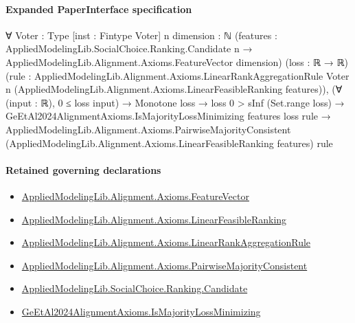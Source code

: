 \documentclass[10pt]{article}
\begin{document}
\paragraph{Expanded PaperInterface specification}
\begin{ReviewVerbatim}
∀ {Voter : Type} [inst : Fintype Voter] {n dimension : ℕ}
  (features :
    AppliedModelingLib.SocialChoice.Ranking.Candidate n → AppliedModelingLib.Alignment.Axioms.FeatureVector dimension)
  (loss : ℝ → ℝ)
  (rule :
    AppliedModelingLib.Alignment.Axioms.LinearRankAggregationRule Voter n
      (AppliedModelingLib.Alignment.Axioms.LinearFeasibleRanking features)),
  (∀ (input : ℝ), 0 ≤ loss input) →
    Monotone loss →
      loss 0 > sInf (Set.range loss) →
        GeEtAl2024AlignmentAxioms.IsMajorityLossMinimizing features loss rule →
          AppliedModelingLib.Alignment.Axioms.PairwiseMajorityConsistent
            (AppliedModelingLib.Alignment.Axioms.LinearFeasibleRanking features) rule
\end{ReviewVerbatim}

\paragraph{Retained governing declarations}
\begin{itemize}\raggedright
\item \hyperlink{library-prerequisite-a0b67c6a143b0b13}{Applied\allowbreak{}Modeling\allowbreak{}Lib.\allowbreak{}Alignment.\allowbreak{}Axioms.\allowbreak{}Feature\allowbreak{}Vector}
\item \hyperlink{library-prerequisite-3c30aae25bef2671}{Applied\allowbreak{}Modeling\allowbreak{}Lib.\allowbreak{}Alignment.\allowbreak{}Axioms.\allowbreak{}Linear\allowbreak{}Feasible\allowbreak{}Ranking}
\item \hyperlink{library-prerequisite-43447e121a1884f9}{Applied\allowbreak{}Modeling\allowbreak{}Lib.\allowbreak{}Alignment.\allowbreak{}Axioms.\allowbreak{}Linear\allowbreak{}Rank\allowbreak{}Aggregation\allowbreak{}Rule}
\item \hyperlink{library-prerequisite-e6dee3706881b80a}{Applied\allowbreak{}Modeling\allowbreak{}Lib.\allowbreak{}Alignment.\allowbreak{}Axioms.\allowbreak{}Pairwise\allowbreak{}Majority\allowbreak{}Consistent}
\item \hyperlink{library-prerequisite-8c0e6c25845ae78a}{Applied\allowbreak{}Modeling\allowbreak{}Lib.\allowbreak{}Social\allowbreak{}Choice.\allowbreak{}Ranking.\allowbreak{}Candidate}
\item \hyperlink{paper-prerequisite-c8ae4ba0fedf8db8}{Ge\allowbreak{}Et\allowbreak{}Al2024\allowbreak{}Alignment\allowbreak{}Axioms.\allowbreak{}Is\allowbreak{}Majority\allowbreak{}Loss\allowbreak{}Minimizing}
\end{itemize}
\end{document}
